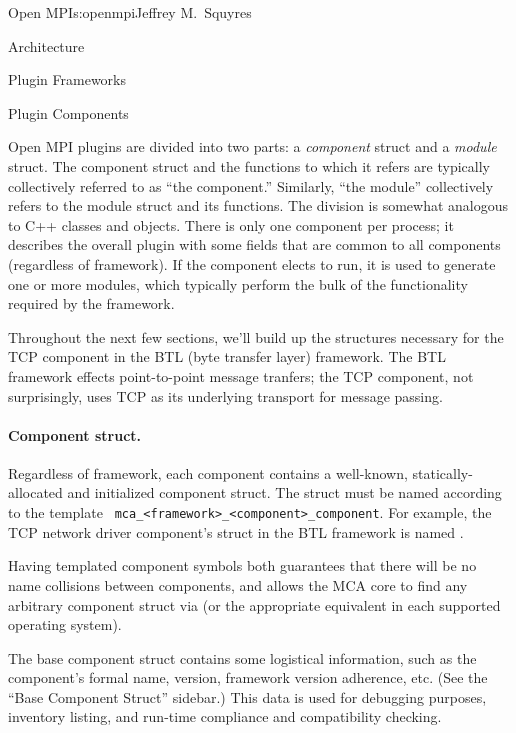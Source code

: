 \begin{aosachapter}{Open MPI}{s:openmpi}{Jeffrey M.\ Squyres}
\begin{aosasect1}{Architecture}
\begin{aosasect2}{Plugin Frameworks}
\end{aosasect2}


\begin{aosasect2}{Plugin Components}

Open MPI plugins are divided into two parts: a \emph{component}
struct and a \emph{module} struct.
%
The component struct and the functions to which it refers are
typically collectively referred to as ``the component.''  Similarly,
``the module'' collectively refers to the module struct and its
functions.
%
The division is somewhat analogous to C++ classes and objects.
%
There is only one component per process; it describes the overall
plugin with some fields that are common to all components (regardless
of framework).
%
If the component elects to run, it is used to generate one or more
modules, which typically perform the bulk of the functionality
required by the framework.

Throughout the next few sections, we'll build up the structures
necessary for the TCP component in the BTL (byte transfer layer)
framework.  The BTL framework effects point-to-point message tranfers;
the TCP component, not surprisingly, uses TCP as its underlying
transport for message passing.


\paragraph{Component struct.} 

Regardless of framework, each component contains a well-known,
statically-allocated and initialized component struct.  
%
The struct must be named according to the template {\tt
  mca\_\-<framework>\_\-<component>\_\-component}.  For example, the
TCP network driver component's struct in the BTL framework is named
.

Having templated component symbols both guarantees that there will be
no name collisions between components, and allows the MCA core to find
any arbitrary component struct via  (or the appropriate
equivalent in each supported operating system).

The base component struct contains some logistical information, such
as the component's formal name, version, framework version adherence,
etc.  (See the ``Base Component Struct'' sidebar.)
%
This data is used for debugging purposes, inventory listing, and
run-time compliance and compatibility checking.


\end{aosasect2}
\end{aosasect1}
\end{aosachapter}
